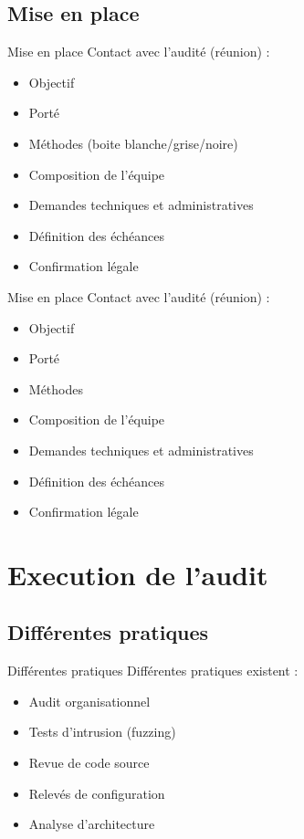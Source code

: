\documentclass{beamer}
\newcommand{\colorized}[1]{{\color{red}{#1}}}
\begin{document}
	\subsection{Mise en place}
	\begin{frame}{Mise en place}
	     Contact avec l'audité (réunion) : 
		\begin{itemize}
			\item Objectif
			\item Porté
			\item Méthodes (boite blanche/grise/noire)
			\item Composition de l'équipe
			\item Demandes techniques et administratives
			\item Définition des échéances
			\item Confirmation légale
		\end{itemize}		
	\end{frame}

	\begin{frame}{Mise en place}
		Contact avec l'audité (réunion) : 
		\begin{itemize}
			\item Objectif \colorized{Garantir une application sans failles de l'OWASP Top 10}
			\item Porté \colorized{Application web}
			\item Méthodes \colorized{Boite blanche}
			\item Composition de l'équipe
			\item Demandes techniques et administratives \colorized{code source}
			\item Définition des échéances \colorized{\today}
			\item Confirmation légale
		\end{itemize}		
	\end{frame}


\section{Execution de l'audit}	
	\subsection{Différentes pratiques}
		\begin{frame}{Différentes pratiques}
			Différentes pratiques existent : 
			\begin{itemize}
				\item Audit organisationnel
				\item Tests d'intrusion (fuzzing)				
				\item Revue de code source
				\item Relevés de configuration
				\item Analyse d'architecture	
			\end{itemize}		
		\end{frame}
	
\end{document}

